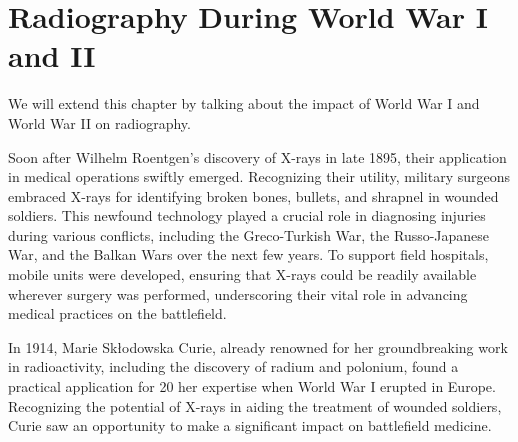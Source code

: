 \documentclass[a4paper,12pt]{report}
\begin{document}
\section{Radiography During World War I and II}
We will extend this chapter by talking about the impact of World War I and World War II on radiography. 

Soon after Wilhelm Roentgen's discovery of X-rays in late 1895, their application in medical
operations swiftly emerged. Recognizing their utility, military surgeons embraced X-rays for
identifying broken bones, bullets, and shrapnel in wounded soldiers. This newfound technology
played a crucial role in diagnosing injuries during various conflicts, including the Greco-Turkish
War, the Russo-Japanese War, and the Balkan Wars over the next few years. To support field
hospitals, mobile units were developed, ensuring that X-rays could be readily available wherever
surgery was performed, underscoring their vital role in advancing medical practices on the
battlefield.

In 1914, Marie Skłodowska Curie, already renowned for her groundbreaking work in
radioactivity, including the discovery of radium and polonium, found a practical application for
20
her expertise when World War I erupted in Europe. Recognizing the potential of X-rays in aiding
the treatment of wounded soldiers, Curie saw an opportunity to make a significant impact on
battlefield medicine.
\end{document}
